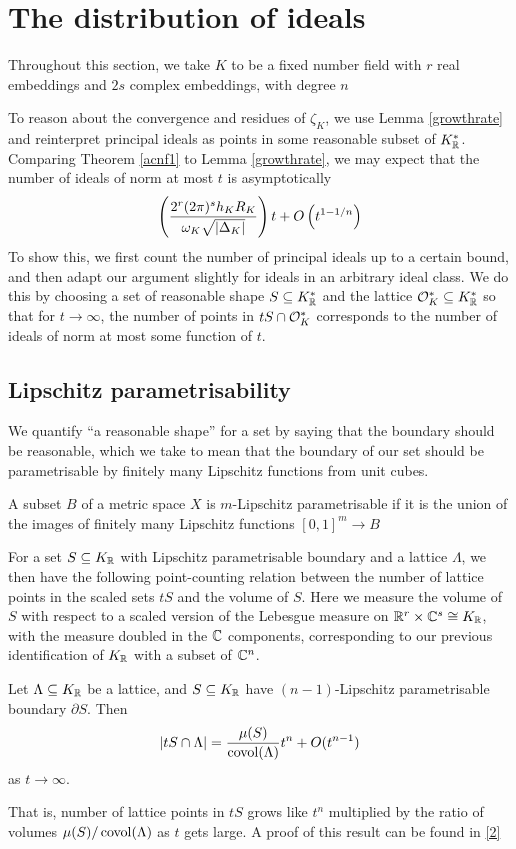 \documentclass[11pt]{report}
\begin{document}
\section{The distribution of ideals}
Throughout this section, we take $K$ to be a fixed number field with $r$ real embeddings and $2s$ complex embeddings, with degree $n$

To reason about the convergence and residues of $\zeta_K$, we use Lemma \ref{growthrate} and reinterpret principal ideals as points in some reasonable subset of $K_{\mathbb{R}}^*$. Comparing Theorem \ref{acnf1} to Lemma \ref{growthrate}, we may expect that the number of ideals of norm at most $t$ is asymptotically
$$
    \left(  \frac{2^r(2\pi)^sh_KR_K}{\omega_K\sqrt{\left| \Delta_K \right|}}  \right)t + O\left(  t^{1 - 1/n}  \right)
$$
To show this, we first count the number of principal ideals up to a certain bound, and then adapt our argument slightly for ideals in an arbitrary ideal class. We do this by choosing a set of reasonable shape $S \subseteq K_{\mathbb{R}}^*$ and the lattice $\mathcal{O}_K^* \subseteq K_{\mathbb{R}}^*$ so that for $t \to \infty$, the number of points in $tS \cap \mathcal{O}_K^*$ corresponds to the number of ideals of norm at most some function of $t$.
\subsection{Lipschitz parametrisability}
We quantify ``a reasonable shape'' for a set by saying that the boundary should be reasonable, which we take to mean that the boundary of our set should be parametrisable by finitely many Lipschitz functions from unit cubes.
\begin{definition}
    A subset $B$ of a metric space $X$ is $m$-Lipschitz parametrisable if it is the union of the images of finitely many Lipschitz functions $[0, 1]^m \to B$
\end{definition}
For a set $S \subseteq K_{\mathbb{R}}$ with Lipschitz parametrisable boundary and a lattice $\Lambda$, we then have the following point-counting relation between the number of lattice points in the scaled sets $tS$ and the volume of $S$. Here we measure the volume of $S$ with respect to a scaled version of the Lebesgue measure on $\mathbb{R}^r \times \mathbb{C}^s \cong K_{\mathbb{R}}$, with the measure doubled in the $\mathbb{C}$ components, corresponding to our previous identification of $K_{\mathbb{R}}$ with a subset of $\mathbb{C}^n$.
\begin{lemma}\label{ptcount}
    Let $\Lambda \subseteq K_{\mathbb{R}}$ be a lattice, and $S \subseteq K_{\mathbb{R}}$ have $(n - 1)$-Lipschitz parametrisable boundary $\partial S$. Then 
    $$
        \left| tS \cap \Lambda \right| = \frac{\mu(S)}{\operatorname{covol}(\Lambda)}t^n + O(t^{n - 1})
    $$
    as $t \to \infty$.
\end{lemma}
That is, number of lattice points in $tS$ grows like $t^n$ multiplied by the ratio of volumes $\mu(S)/\operatorname{covol}(\Lambda)$ as $t$ gets large. A proof of this result can be found in \hyperlink{sutherland}{[2]}
\end{document}
